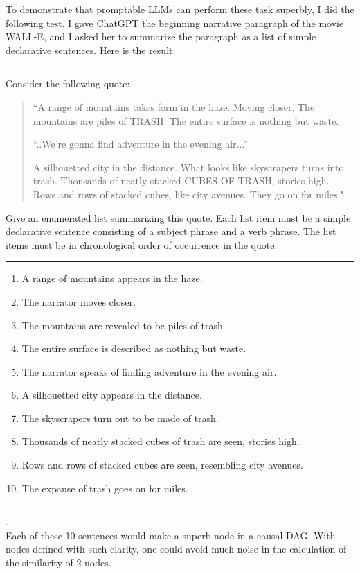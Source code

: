 \documentclass[12pt]{article}
\begin{document}
To demonstrate that 
promptable LLMs can 
perform these task superbly, I
did the following test. I gave ChatGPT the
beginning narrative paragraph of the movie 
WALL-E, and I asked her to summarize the
paragraph as a list of simple declarative sentences.
Here is the result:
\\
\hrule
{} 

Consider the following quote:
\begin{quote}
``A range of mountains takes form in the haze.
Moving closer.
The mountains are piles of TRASH.
The entire surface is nothing but waste.

``..We're gonna find adventure in the evening air...''

A silhouetted city in the distance.
What looks like skyscrapers turns into trash.
Thousands of neatly stacked CUBES OF TRASH, stories high.
Rows and rows of stacked cubes, like city avenues.
They go on for miles."
\end{quote}

Give an enumerated list summarizing this quote.
Each list item must be a simple declarative sentence
consisting of a subject phrase and a verb phrase.
The list items must be in chronological order of occurrence
in the quote.
\\
\hrule
{}

\begin{enumerate}
\item A range of mountains appears in the haze.
\item The narrator moves closer.
\item The mountains are revealed to be piles of trash.
\item The entire surface is described as nothing but waste.
\item The narrator speaks of finding adventure in the evening air.
\item A silhouetted city appears in the distance.
\item The skyscrapers turn out to be made of trash.
\item Thousands of neatly stacked cubes of trash are seen, stories high.
\item Rows and rows of stacked cubes are seen, resembling city avenues.
\item The expanse of trash goes on for miles.
\end{enumerate}
\hrule
.\\
Each of these 10 sentences would make
a superb node in a causal DAG. With nodes defined
with such clarity, 
one could avoid much noise in the calculation of the similarity
of 2 nodes.
\end{document}

